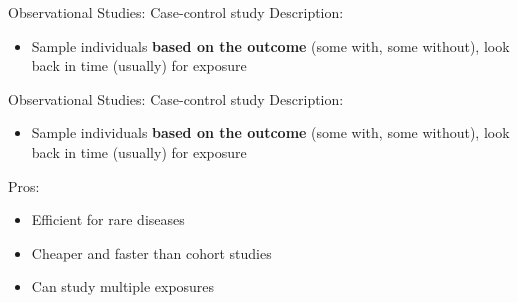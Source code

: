 \documentclass[
  ignorenonframetext,
]{beamer}
\providecommand{\tightlist}{%
  \setlength{\itemsep}{0pt}\setlength{\parskip}{0pt}}
\begin{document}
\begin{frame}{Observational Studies: Case-control study}
\protect\hypertarget{observational-studies-case-control-study}{}
Description:

\begin{itemize}
\tightlist
\item
  Sample individuals \textbf{based on the outcome} (some with, some
  without), look back in time (usually) for exposure
\end{itemize}
\end{frame}

\begin{frame}{Observational Studies: Case-control study}
\protect\hypertarget{observational-studies-case-control-study-1}{}
Description:

\begin{itemize}
\tightlist
\item
  Sample individuals \textbf{based on the outcome} (some with, some
  without), look back in time (usually) for exposure
\end{itemize}

Pros:

\begin{itemize}
\tightlist
\item
  Efficient for rare diseases
\item
  Cheaper and faster than cohort studies
\item
  Can study multiple exposures
\end{itemize}
\end{frame}
\end{document}
